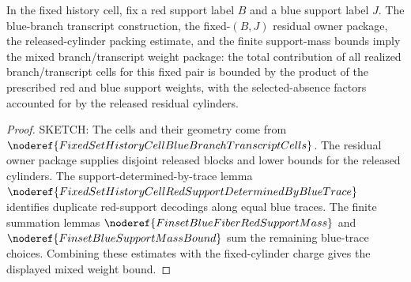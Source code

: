 \begin{helper}
In the fixed history cell, fix a red support label \(B\) and a blue support
label \(J\).  The blue-branch transcript construction, the fixed-\((B,J)\)
residual owner package, the released-cylinder packing estimate, and the
finite support-mass bounds imply the mixed branch/transcript weight package:
the total contribution of all realized branch/transcript cells for this
fixed pair is bounded by the product of the prescribed red and blue support
weights, with the selected-absence factors accounted for by the released
residual cylinders.
\end{helper}
\begin{proof}
SKETCH:
The cells and their geometry come from
\(\noderef{FixedSetHistoryCellBlueBranchTranscriptCells}\).  The residual
owner package supplies disjoint released blocks and lower bounds for the
released cylinders.  The support-determined-by-trace lemma
\(\noderef{FixedSetHistoryCellRedSupportDeterminedByBlueTrace}\) identifies
duplicate red-support decodings along equal blue traces.  The finite
summation lemmas \(\noderef{FinsetBlueFiberRedSupportMass}\) and
\(\noderef{FinsetBlueSupportMassBound}\) sum the remaining blue-trace
choices.
Combining these estimates with the fixed-cylinder charge gives the displayed
mixed weight bound.
\end{proof}
